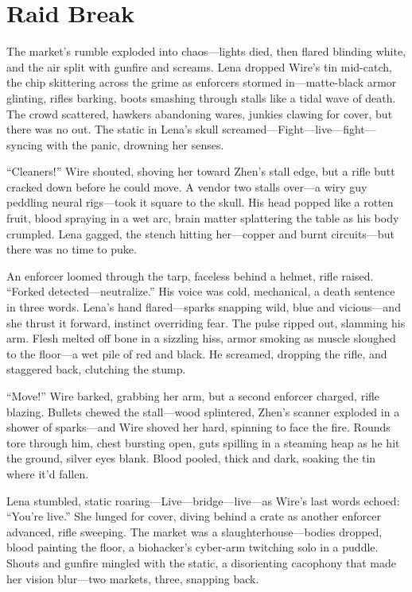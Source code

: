 \documentclass[12pt]{book}
\begin{document}
\section{Raid Break}

The market’s rumble exploded into chaos---lights died, then flared blinding white, and the air split with gunfire and screams. Lena dropped Wire’s tin mid-catch, the chip skittering across the grime as enforcers stormed in---matte-black armor glinting, rifles barking, boots smashing through stalls like a tidal wave of death. The crowd scattered, hawkers abandoning wares, junkies clawing for cover, but there was no out. The static in Lena’s skull screamed---Fight---live---fight---syncing with the panic, drowning her senses.

``Cleaners!'' Wire shouted, shoving her toward Zhen’s stall edge, but a rifle butt cracked down before he could move. A vendor two stalls over---a wiry guy peddling neural rigs---took it square to the skull. His head popped like a rotten fruit, blood spraying in a wet arc, brain matter splattering the table as his body crumpled. Lena gagged, the stench hitting her---copper and burnt circuits---but there was no time to puke.

An enforcer loomed through the tarp, faceless behind a helmet, rifle raised. ``Forked detected---neutralize.'' His voice was cold, mechanical, a death sentence in three words. Lena’s hand flared---sparks snapping wild, blue and vicious---and she thrust it forward, instinct overriding fear. The pulse ripped out, slamming his arm. Flesh melted off bone in a sizzling hiss, armor smoking as muscle sloughed to the floor---a wet pile of red and black. He screamed, dropping the rifle, and staggered back, clutching the stump.

``Move!'' Wire barked, grabbing her arm, but a second enforcer charged, rifle blazing. Bullets chewed the stall---wood splintered, Zhen’s scanner exploded in a shower of sparks---and Wire shoved her hard, spinning to face the fire. Rounds tore through him, chest bursting open, guts spilling in a steaming heap as he hit the ground, silver eyes blank. Blood pooled, thick and dark, soaking the tin where it’d fallen.

Lena stumbled, static roaring---Live---bridge---live---as Wire’s last words echoed: ``You’re live.'' She lunged for cover, diving behind a crate as another enforcer advanced, rifle sweeping. The market was a slaughterhouse---bodies dropped, blood painting the floor, a biohacker’s cyber-arm twitching solo in a puddle. Shouts and gunfire mingled with the static, a disorienting cacophony that made her vision blur---two markets, three, snapping back.
\end{document}
